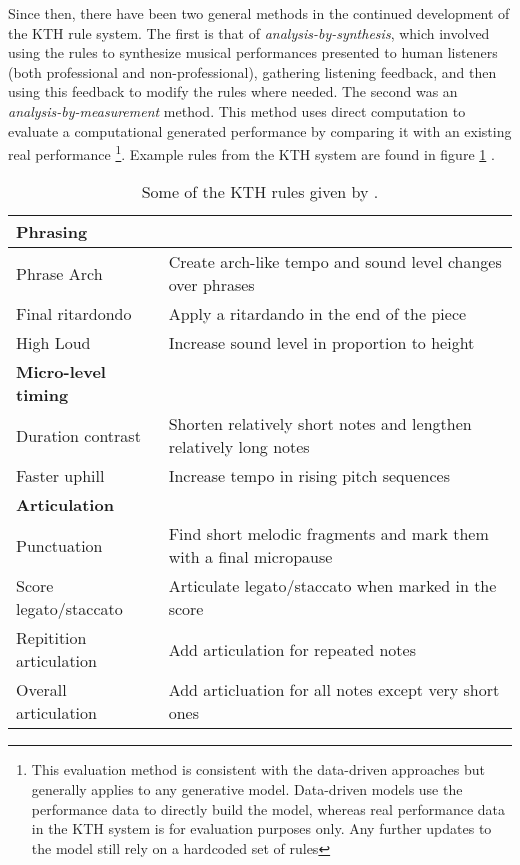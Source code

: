 Since then, there have been two general methods in the continued development of the KTH rule system. The first is that of \emph{analysis-by-synthesis}, which involved using the rules to synthesize musical performances presented to human listeners (both professional and non-professional), gathering listening feedback, and then using this feedback to modify the rules where needed. The second was an \emph{analysis-by-measurement} method. This method uses direct computation to evaluate a computational generated performance by comparing it with an existing real performance \footnote{This evaluation method is consistent with the data-driven approaches but generally applies to any generative model. Data-driven models use the performance data to directly build the model, whereas real performance data in the KTH system is for evaluation purposes only. Any further updates to the model still rely on a hardcoded set of rules}. Example rules from the KTH system are found in figure \ref{tab:kth-rules} . 


\begin{table}
    \setlength{\extrarowheight}{7pt}
    \begin{center}
    \begin{tabular}{l | l }
        \textbf{Phrasing} & \\
        \hline
        Phrase Arch & Create arch-like tempo and sound level changes over phrases \\
        Final ritardondo & Apply a ritardando in the end of the piece \\
        High Loud & Increase sound level in proportion to height \\
        \textbf{Micro-level timing} & \\
        \hline
        Duration contrast & Shorten relatively short notes and lengthen relatively long notes \\ 
        Faster uphill & Increase tempo in rising pitch sequences \\
        \textbf{Articulation} & \\
        \hline
        Punctuation & Find short melodic fragments and mark them with a final micropause \\
        Score legato/staccato & Articulate legato/staccato when marked in the score \\
        Repitition articulation & Add articulation for repeated notes \\
        Overall articulation & Add articluation for all notes except very short ones 
    \end{tabular}
    \caption{Some of the KTH rules given by \citet{friberg2006overview}.}
    \label{tab:kth-rules}
    \end{center}
\end{table}


